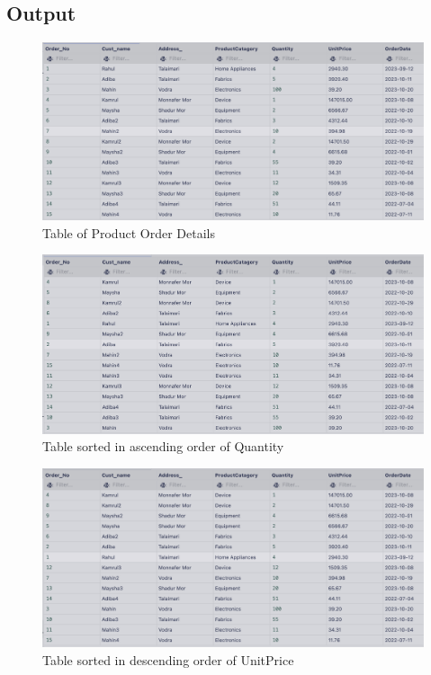 \documentclass[12pt]{article}
\begin{document}
\subsection{Output}
\begin{figure}[H]
    \centering
    \includegraphics[width=\textwidth]{images/1full.png}
    \caption{Table of Product Order Details}
    \label{fig:table}
\end{figure}
\begin{figure}[H]
    \centering
    \includegraphics[width=\textwidth]{images/2sortQuan.png}
    \caption{Table sorted in ascending order of Quantity}
    \label{fig:sort1}
\end{figure}
\begin{figure}[H]
    \centering
    \includegraphics[width=\textwidth]{images/3sortUnit.png}
    \caption{Table sorted in descending order of UnitPrice}
    \label{fig:sort2}
\end{figure}
\end{document}
